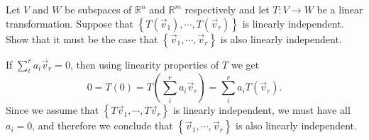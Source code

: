 \documentclass{ximera}
\begin{document}

\begin{problem}\label{prb:10.74} Let $V$ and $W$ be subspaces of $\mathbb{R}^{n}$ and $\mathbb{R}^{m}$
respectively and let $T:V\rightarrow W$ be a linear transformation. Suppose
that $\left\{ T(\vec{v}_{1}),\cdots ,T(\vec{v}_{r})\right\} $ is linearly
independent. Show that it must be the case that $\left\{ \vec{v}_{1},\cdots ,
\vec{v}_{r}\right\} $ is also linearly independent.
\begin{hint}
If $\sum_i^r a_i \vec{v}_r =0$, then using linearity properties of $T$ we get
\[ 0 = T(0) =  T\left(\sum_i^r a_i \vec{v}_r\right) =
\sum_i^r a_i T(\vec{v}_r).\]
Since we assume that  $\left\{ T\vec{v}_{1},\cdots ,T\vec{v}_{r}\right\} $ is linearly
independent, we must have all $a_i=0$, and therefore we conclude that
 $\left\{ \vec{v}_{1},\cdots ,
\vec{v}_{r}\right\} $ is also linearly independent.
\end{hint}
\end{problem}
\end{document}
